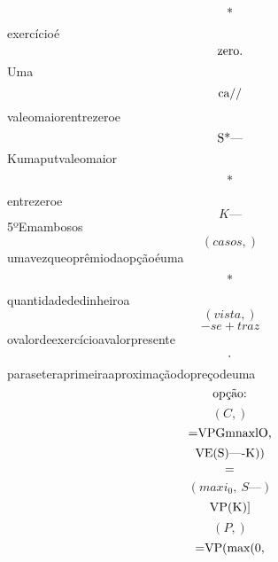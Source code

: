 \documentclass{article}
\begin{document}
\begin{equation}
$*$
\end{equation}exercícioé\begin{equation}
$zero.$
\end{equation}Uma\begin{equation}
$ca//$
\end{equation}valeomaiorentrezeroe\begin{equation}
$S*—$
\end{equation}Kumaputvaleomaior\begin{equation}
$*$
\end{equation}entrezeroe\begin{equation}
K—
\end{equation}5ºEmambosos\begin{equation}
\left( casos,\right)
\end{equation}umavezqueoprêmiodaopçãoéuma\begin{equation}
$*$
\end{equation}quantidadededinheiroa\begin{equation}
\left( vista,\right)
\end{equation}\begin{equation}
- se + traz
\end{equation}ovalordeexercícioavalorpresente\begin{equation}
$.$
\end{equation}paraseteraprimeiraaproximaçãodopreçodeuma\begin{equation}
$opção:$
\end{equation}\begin{equation}
\left( C,\right)
\end{equation}\begin{equation}
$=VPGmnaxlO,$
\end{equation}\begin{equation}
$VE(S)—-K))$
\end{equation}\begin{equation}
$=$
\end{equation}\begin{equation}
\left( maxi_{0}, \  S—\right)
\end{equation}\begin{equation}
$VP(K)]$
\end{equation}\begin{equation}
\left( P,\right)
\end{equation}\begin{equation}
$=VP(max(0,$
\end{equation}\begin{equation}

\end{equation}
\end{document}

